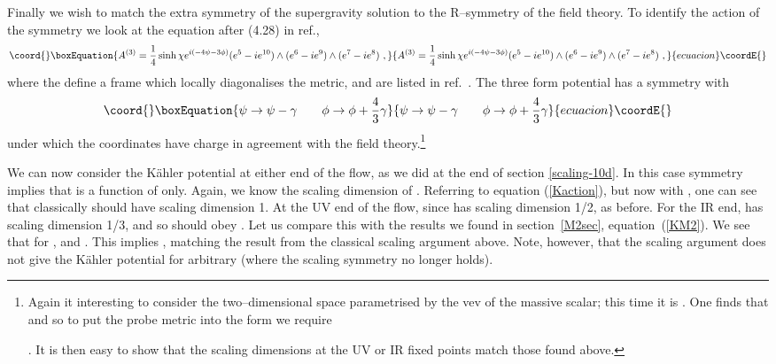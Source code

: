 \documentclass[a4paper,12pt]{article}
\providecommand{\reef}[1]{(\ref{#1})}
\begin{document}
Finally we wish to match the extra \coordHE{} symmetry of the supergravity
solution to the R--symmetry of the field theory. To identify the
action of the \coordHE{} symmetry we look at the equation after (4.28) in
ref.\cite{newwarner},
\begin{equation}\coord{}\boxEquation{
 A^{(3)} = {1 \over 4} \sinh{\chi} 
e^{i(-4 \psi -3 \phi)} 
(e^5 - i e^{10}) \wedge (e^6 - i e^9) \wedge (e^7 - i e^8)\ , 
}{
 A^{(3)} = {1 \over 4} \sinh{\chi} 
e^{i(-4 \psi -3 \phi)} 
(e^5 - i e^{10}) \wedge (e^6 - i e^9) \wedge (e^7 - i e^8)\ , 
}{ecuacion}\coordE{}\end{equation}
where the \coordHE{} define a frame which locally diagonalises the metric,
and are listed in ref.~\cite{newwarner}. The three form potential
\coordHE{} has a \coordHE{} symmetry with
\begin{equation}\coord{}\boxEquation{
  \psi \rightarrow \psi - 
\gamma \qquad \phi \rightarrow \phi + {4 \over 3} \gamma
}{
  \psi \rightarrow \psi - 
\gamma \qquad \phi \rightarrow \phi + {4 \over 3} \gamma
}{ecuacion}\coordE{}\end{equation} 
under which the coordinates \coordHE{} have charge \coordHE{} in
agreement with the field theory.\footnote{Again it interesting to
  consider the two--dimensional space parametrised by the vev of the
  massive scalar; this time it is \coordHE{}.  One finds that \coordHE{} and so to put the probe metric into the form
  \coordHE{} we require

  \coordHE{}. 
It is then easy to show that the scaling dimensions at the UV or IR
fixed points match those found above.}

We can now consider the K\"ahler potential at either end of the flow,
as we did at the end of section \ref{scaling-10d}. In this case
\coordHE{} symmetry implies that \coordHE{} is a function of \coordHE{} only.  Again,
we know the scaling dimension of \coordHE{}.  Referring to equation
\reef{Kaction}, but now with \coordHE{}, one can see that classically \coordHE{}
should have scaling dimension 1.  At the UV end of the flow, since
\coordHE{} has scaling dimension 1/2, \coordHE{} as before.  For the
IR end, \coordHE{} has scaling dimension 1/3, and so \coordHE{} should obey
\coordHE{}.  Let us compare this with the results we found in
section~\ref{M2sec},  equation~\reef{KM2}.  We see that
for \coordHE{}, \coordHE{} and \coordHE{}.  This
implies \coordHE{}, matching the result from the classical
scaling argument above. Note, however, that the scaling argument does
not give the K\"ahler potential for arbitrary \coordHE{} (where the scaling
symmetry no longer holds).
\end{document}
